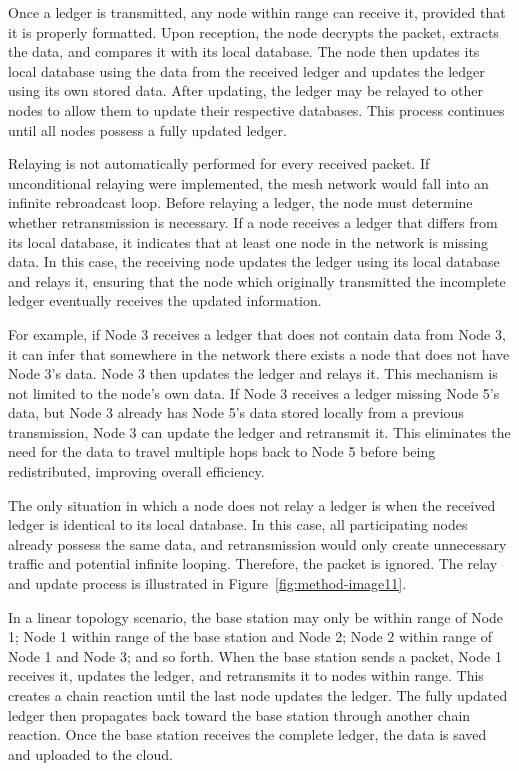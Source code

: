 Once a ledger is transmitted, any node within range can receive it,
provided that it is properly formatted. Upon reception, the node
decrypts the packet, extracts the data, and compares it with its local
database. The node then updates its local database using the data from
the received ledger and updates the ledger using its own stored data.
After updating, the ledger may be relayed to other nodes to allow them
to update their respective databases. This process continues until all
nodes possess a fully updated ledger.

Relaying is not automatically performed for every received packet. If
unconditional relaying were implemented, the mesh network would fall
into an infinite rebroadcast loop. Before relaying a ledger, the node
must determine whether retransmission is necessary. If a node receives a
ledger that differs from its local database, it indicates that at least
one node in the network is missing data. In this case, the receiving
node updates the ledger using its local database and relays it, ensuring
that the node which originally transmitted the incomplete ledger
eventually receives the updated information.

For example, if Node 3 receives a ledger that does not contain data from
Node 3, it can infer that somewhere in the network there exists a node
that does not have Node 3's data. Node 3 then updates the ledger and
relays it. This mechanism is not limited to the node's own data. If Node
3 receives a ledger missing Node 5's data, but Node 3 already has Node
5's data stored locally from a previous transmission, Node 3 can update
the ledger and retransmit it. This eliminates the need for the data to
travel multiple hops back to Node 5 before being redistributed,
improving overall efficiency.

The only situation in which a node does not relay a ledger is when the
received ledger is identical to its local database. In this case, all
participating nodes already possess the same data, and retransmission
would only create unnecessary traffic and potential infinite looping.
Therefore, the packet is ignored. The relay and update process is illustrated in Figure~\ref{fig:method-image11}.

In a linear topology scenario, the base station may only be within range
of Node 1; Node 1 within range of the base station and Node 2; Node 2
within range of Node 1 and Node 3; and so forth. When the base station
sends a packet, Node 1 receives it, updates the ledger, and retransmits
it to nodes within range. This creates a chain reaction until the last
node updates the ledger. The fully updated ledger then propagates back
toward the base station through another chain reaction. Once the base
station receives the complete ledger, the data is saved and uploaded to
the cloud.

